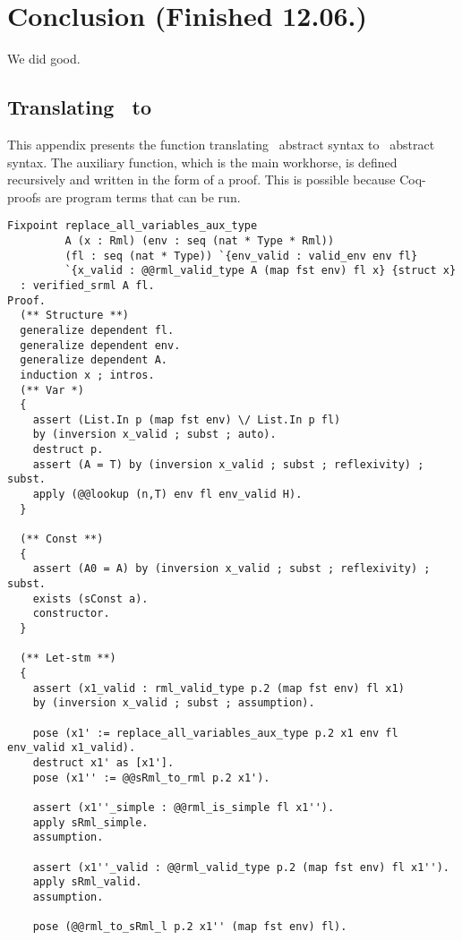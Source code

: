 \documentclass[11pt, leqno, titlepage]{article}
\theoremstyle{definition}
\begin{document}
\section{Conclusion (Finished 12.06.)}
We did good. 

\newpage




\newpage
\begin{appendices}

  \section{Translating \rmlx\ to \srml}
  \label{app:rml-to-srml}
  This appendix presents the function translating \rmlx\ abstract syntax to \srml\
  abstract syntax. The auxiliary function, which is the main workhorse, is defined
  recursively and written in the form of a proof. This is possible because Coq-proofs
  are program terms that can be run. 
\begin{lstlisting}[language=coq]
Fixpoint replace_all_variables_aux_type
         A (x : Rml) (env : seq (nat * Type * Rml))
         (fl : seq (nat * Type)) `{env_valid : valid_env env fl}
         `{x_valid : @@rml_valid_type A (map fst env) fl x} {struct x}
  : verified_srml A fl.
Proof.
  (** Structure **)
  generalize dependent fl.
  generalize dependent env.
  generalize dependent A.
  induction x ; intros.
  (** Var *)
  {
    assert (List.In p (map fst env) \/ List.In p fl) 
    by (inversion x_valid ; subst ; auto).
    destruct p.
    assert (A = T) by (inversion x_valid ; subst ; reflexivity) ; subst.
    apply (@@lookup (n,T) env fl env_valid H).
  }

  (** Const **)
  {
    assert (A0 = A) by (inversion x_valid ; subst ; reflexivity) ; subst.
    exists (sConst a).
    constructor.
  }
      
  (** Let-stm **)
  {
    assert (x1_valid : rml_valid_type p.2 (map fst env) fl x1) 
    by (inversion x_valid ; subst ; assumption).

    pose (x1' := replace_all_variables_aux_type p.2 x1 env fl env_valid x1_valid).
    destruct x1' as [x1'].
    pose (x1'' := @@sRml_to_rml p.2 x1').

    assert (x1''_simple : @@rml_is_simple fl x1'').
    apply sRml_simple.
    assumption.

    assert (x1''_valid : @@rml_valid_type p.2 (map fst env) fl x1'').
    apply sRml_valid.
    assumption.
    
    pose (@@rml_to_sRml_l p.2 x1'' (map fst env) fl).
        

\end{lstlisting}
\end{appendices}
\end{document}
